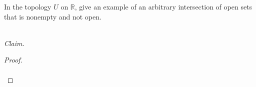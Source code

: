 In the topology $U$ on $\mathbb{R}$, give an example of an arbitrary intersection of open sets that is nonempty and not 
open.

\ \\
\emph{Claim.}

\begin{proof}\renewcommand{\qedsymbol}{}\ \\\\
\end{proof}